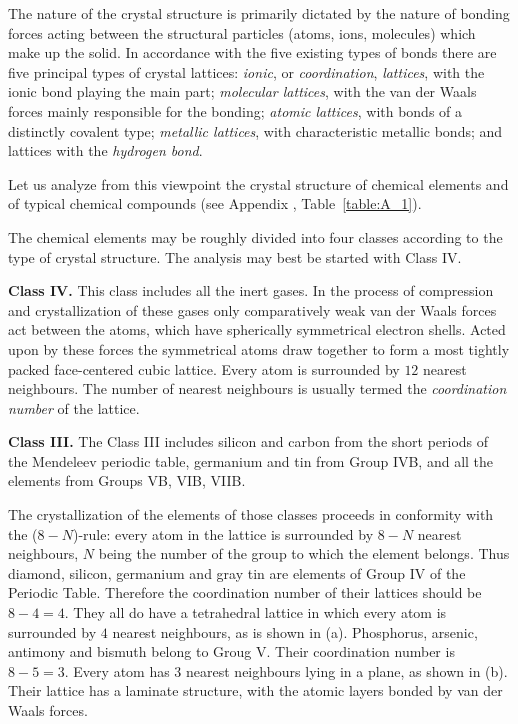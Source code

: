 The nature of the crystal structure is primarily dictated by the nature of bonding forces acting between the structural particles (atoms, ions, molecules) which make up the solid. In accordance with the five existing types of bonds there are five principal types of crystal lattices: \textit{ionic}, or \textit{coordination}, \textit{lattices}, with the ionic bond playing the main part; \textit{molecular lattices}, with the van der Waals forces mainly responsible for the bonding; \textit{atomic lattices}, with bonds of a distinctly covalent type; \textit{metallic lattices}, with characteristic metallic bonds; and lattices with the \textit{hydrogen bond}.

Let us analyze from this viewpoint the crystal structure of chemical elements and of typical chemical compounds (see Appendix , Table~\ref{table:A_1}).

The chemical elements may be roughly divided into four classes according to the type of crystal structure. The analysis may best be started with Class IV.

\textbf{Class IV.} This class includes all the inert gases. In the process of compression and crystallization of these gases only comparatively weak van der Waals forces act between the atoms, which have spherically symmetrical electron shells. Acted upon by these forces the symmetrical atoms draw together to form a most tightly packed face-centered cubic lattice. Every atom is surrounded by $12$ nearest neighbours. The number of nearest neighbours is usually termed the \textit{coordination number} of the lattice.

\textbf{Class III.} The Class III includes silicon and carbon from the short periods of the Mendeleev periodic table, germanium and tin from Group IVB, and all the elements from Groups VB, VIB, VIIB.

The crystallization of the elements of those classes proceeds in conformity with the ($8-N$)-rule: every atom in the lattice is surrounded
by $8-N$ nearest neighbours, $N$ being the number of the group to which the element belongs. Thus diamond, silicon, germanium and gray tin are elements of Group IV of the Periodic Table. Therefore the coordination number of their lattices should be $8-4=4$. They all do have a tetrahedral lattice in which every atom is surrounded by $4$ nearest neighbours, as is shown in (a). Phosphorus, arsenic, antimony and bismuth belong to Groug V. Their coordination number is $8-5=3$. Every atom has $3$ nearest neighbours lying in a plane, as shown in (b). Their lattice has a laminate structure, with the atomic layers bonded by van der Waals forces.

